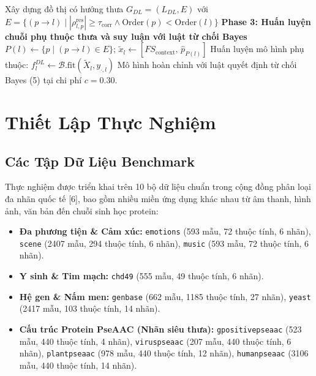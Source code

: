 \documentclass[10pt,a4paper,twoside]{article}
\begin{document}
\begin{algorithm}[H]
\begin{algorithmic}[1]
\State Xây dựng đồ thị có hướng thưa $G_{DL} = (L_{DL}, E)$ với $E = \{(p \to l) \mid |\rho_{l,p}^{\text{res}}| \ge \tau_{\text{corr}} \land \text{Order}(p) < \text{Order}(l)\}$
\Statex \textbf{Phase 3: Huấn luyện chuỗi phụ thuộc thưa và suy luận với luật từ chối Bayes}
    \State $P(l) \leftarrow \{p \mid (p \to l) \in E\}$; \quad $\tilde{x}_l \leftarrow [FS_{\text{context}}, \, \hat{p}_{P(l)}]$
    \State Huấn luyện mô hình phụ thuộc: $f_l^{DL} \leftarrow \mathcal{B}.\text{fit}(\tilde{X}_l, y_{\cdot, l})$
\EndFor
\State \Return Mô hình hoàn chỉnh với luật quyết định từ chối Bayes (5) tại chi phí $c = 0.30$.
\end{algorithmic}
\end{algorithm}

\section{Thiết Lập Thực Nghiệm}

\subsection{Các Tập Dữ Liệu Benchmark}
Thực nghiệm được triển khai trên 10 bộ dữ liệu chuẩn trong cộng đồng phân loại đa nhãn quốc tế [6], bao gồm nhiều miền ứng dụng khác nhau từ âm thanh, hình ảnh, văn bản đến chuỗi sinh học protein:
\begin{itemize}[leftmargin=*]
    \item \textbf{Đa phương tiện \& Cảm xúc:} \texttt{emotions} (593 mẫu, 72 thuộc tính, 6 nhãn), \texttt{scene} (2407 mẫu, 294 thuộc tính, 6 nhãn), \texttt{music} (593 mẫu, 72 thuộc tính, 6 nhãn).
    \item \textbf{Y sinh \& Tim mạch:} \texttt{chd49} (555 mẫu, 49 thuộc tính, 6 nhãn).
    \item \textbf{Hệ gen \& Nấm men:} \texttt{genbase} (662 mẫu, 1185 thuộc tính, 27 nhãn), \texttt{yeast} (2417 mẫu, 103 thuộc tính, 14 nhãn).
    \item \textbf{Cấu trúc Protein PseAAC (Nhãn siêu thưa):} \texttt{gpositivepseaac} (523 mẫu, 440 thuộc tính, 4 nhãn), \texttt{viruspseaac} (207 mẫu, 440 thuộc tính, 6 nhãn), \texttt{plantpseaac} (978 mẫu, 440 thuộc tính, 12 nhãn), \texttt{humanpseaac} (3106 mẫu, 440 thuộc tính, 14 nhãn).
\end{itemize}
\end{document}
